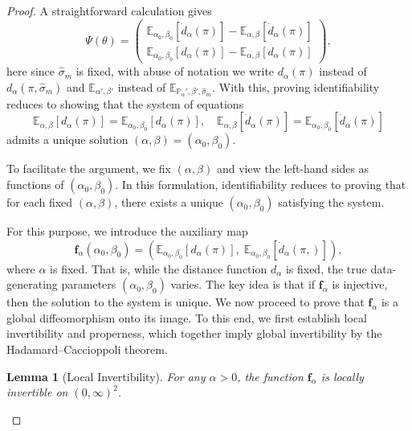\documentclass{article}
\renewcommand{\P}{\mathbb{P}}
\newcommand{\E}{ \mathbb{E}}
\newtheorem{lemma}[theorem]{Lemma}     %
\begin{document}
\begin{proof}
A straightforward calculation gives
\[
\Psi(\theta)
=
\begin{pmatrix}
\mathbb{E}_{\alpha_0,\beta_0}\left[\dot{d}_\alpha(\pi)\right] - \mathbb{E}_{\alpha,\beta}\left[\dot{d}_\alpha(\pi)\right]
\\[6pt]
\mathbb{E}_{\alpha_0,\beta_0}\left[d_\alpha(\pi)\right] - \mathbb{E}_{\alpha,\beta}\left[d_\alpha(\pi)\right]
\end{pmatrix},
\]
here since $\hat\sigma_m$ is fixed, with abuse of notation we write $d_\alpha(\pi)$ instead of $d_\alpha(\pi,\hat\sigma_m)$ and $\E_{\alpha',\beta'}$ instead of $\E_{\P{_\alpha',\beta',\hat \sigma_m}}$.
With this, proving identifiability reduces to showing that the system of equations
\[
\mathbb{E}_{\alpha,\beta}[d_\alpha(\pi)] = \mathbb{E}_{\alpha_0,\beta_0}[d_\alpha(\pi)],
\quad
\mathbb{E}_{\alpha,\beta}[\dot{d}_\alpha(\pi)] = \mathbb{E}_{\alpha_0,\beta_0}[\dot{d}_\alpha(\pi)]
\]
admits a unique solution \((\alpha,\beta) = (\alpha_0,\beta_0)\).

To facilitate the argument, we fix \((\alpha,\beta)\) and view the left-hand sides as functions of \((\alpha_0,\beta_0)\). In this formulation, identifiability reduces to proving that for each fixed \((\alpha,\beta)\), there exists a unique \((\alpha_0,\beta_0)\) satisfying the system.

For this purpose, we introduce the auxiliary map
\[
\boldsymbol{f}_{\alpha}(\alpha_0,\beta_0)
=
\left(
\mathbb{E}_{{\alpha_0,\beta_0}}[d_{\alpha}(\pi)],\;
\mathbb{E}_{{\alpha_0,\beta_0}}[\dot{d}_{\alpha}(\pi,)]
\right),
\]
where \(\alpha \) is fixed. That is, while the distance function $d_\alpha$ is fixed, the true data-generating parameters \((\alpha_0,\beta_0)\) varies.
The key idea is that if \(\boldsymbol{f}_{\alpha}\) is injective, then the solution to the system is unique. We now proceed to prove that \(\boldsymbol{f}_{\alpha}\) is a global diffeomorphism onto its image. To this end, we first establish local invertibility and properness, which together imply global invertibility by the Hadamard--Caccioppoli theorem.



\begin{lemma}[Local Invertibility]\label{lem:local_invertibility}
For any \(\alpha > 0\), the function \(\boldsymbol{f}_{\alpha}\) is locally invertible on \((0,\infty)^2\).
\end{lemma}


\end{proof}
\end{document}
